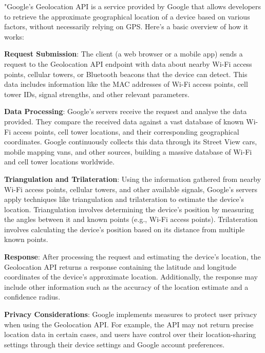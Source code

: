 

"Google's Geolocation API is a service provided by Google that allows developers to retrieve the approximate geographical location of a device based on various factors, without necessarily relying on \ac{GPS}. Here's a basic overview of how it works:

\textbf{Request Submission}: The client (a web browser or a mobile app) sends a request to the Geolocation API endpoint with data about nearby Wi-Fi access points, cellular towers, or Bluetooth beacons that the device can detect. This data includes information like the \ac{MAC} addresses of Wi-Fi access points, cell tower IDs, signal strengths, and other relevant parameters.

\textbf{Data Processing}: Google's servers receive the request and analyse the data provided. They compare the received data against a vast database of known Wi-Fi access points, cell tower locations, and their corresponding geographical coordinates. Google continuously collects this data through its Street View cars, mobile mapping vans, and other sources, building a massive database of Wi-Fi and cell tower locations worldwide.

\textbf{Triangulation and Trilateration}: Using the information gathered from nearby Wi-Fi access points, cellular towers, and other available signals, Google's servers apply techniques like triangulation and trilateration to estimate the device's location. Triangulation involves determining the device's position by measuring the angles between it and known points (e.g., Wi-Fi access points). Trilateration involves calculating the device's position based on its distance from multiple known points.

\textbf{Response}: After processing the request and estimating the device's location, the Geolocation API returns a response containing the latitude and longitude coordinates of the device's approximate location. Additionally, the response may include other information such as the accuracy of the location estimate and a confidence radius.

\textbf{Privacy Considerations}: Google implements measures to protect user privacy when using the Geolocation API. For example, the \ac{API} may not return precise location data in certain cases, and users have control over their location-sharing settings through their device settings and Google account preferences.

